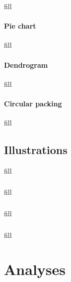\documentclass[
  b5paper]{book}
\begin{document}
fill

\hypertarget{pie-chart}{%
\subsubsection*{Pie chart}\label{pie-chart}}

fill

\hypertarget{dendrogram}{%
\subsubsection*{Dendrogram}\label{dendrogram}}

fill

\hypertarget{circular-packing}{%
\subsubsection*{Circular packing}\label{circular-packing}}

fill

\hypertarget{illustrations}{%
\section{Illustrations}\label{illustrations}}

fill

\hypertarget{section-1}{%
\subsection*{}\label{section-1}}

fill

\hypertarget{section-2}{%
\subsection*{}\label{section-2}}

fill

\hypertarget{section-3}{%
\subsection*{}\label{section-3}}

fill

\hypertarget{analyses-1}{%
\chapter{Analyses}\label{analyses-1}}
\end{document}
